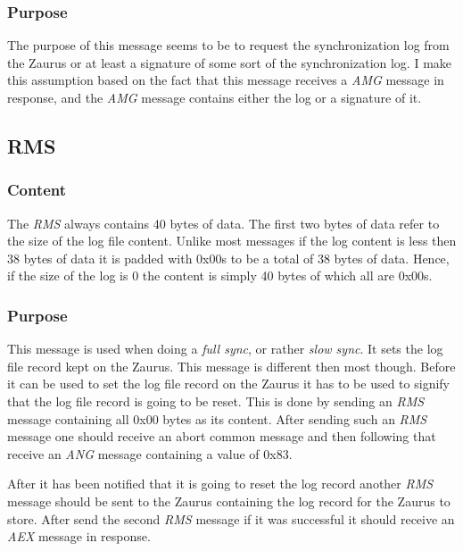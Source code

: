             \subsubsection{Purpose}

            The purpose of this message seems to be to request the
            synchronization log from the Zaurus or at least a signature of some
            sort of the synchronization log. I make this assumption based on
            the fact that this message receives a \emph{AMG} message in
            response, and the \emph{AMG} message contains either the log or a
            signature of it.

        \subsection{RMS}

            \subsubsection{Content}

            The \emph{RMS} always contains 40 bytes of data.  The first
            two bytes of data refer to the size of the log file content.
            Unlike most messages if the log content is less then 38
            bytes of data it is padded with 0x00s to be a total of 38
            bytes of data. Hence, if the size of the log is 0 the
            content is simply 40 bytes of which all are 0x00s.
            
            \subsubsection{Purpose}

            This message is used when doing a \emph{full sync}, or
            rather \emph{slow sync}. It sets the log file record kept on
            the Zaurus. This message is different then most though.
            Before it can be used to set the log file record on the
            Zaurus it has to be used to signify that the log file record
            is going to be reset. This is done by sending an \emph{RMS}
            message containing all 0x00 bytes as its content. After
            sending such an \emph{RMS} message one should receive an
            abort common message and then following that receive an
            \emph{ANG} message containing a value of 0x83.

            After it has been notified that it is going to reset the log
            record another \emph{RMS} message should be sent to the Zaurus
            containing the log record for the Zaurus to store. After
            send the second \emph{RMS} message if it was successful it
            should receive an \emph{AEX} message in response.

